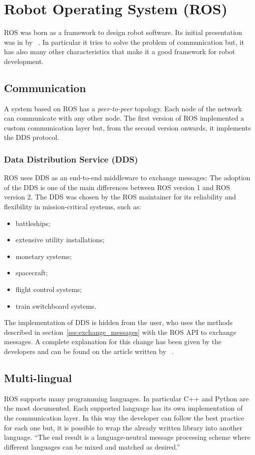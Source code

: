 \documentclass[../thesis.tex]{subfiles}
\begin{document}
\section{Robot Operating System (ROS)}
\acrshort{ROS} was born as a framework to design robot software. Its initial presentation was in \citeyear{paper:ros} by \citeauthor{paper:ros}~\cite{paper:ros}. In particular it tries to solve the problem of communication but, it has also many other characteristics that make it a good framework for robot development.
\subsection{Communication}
A system based on \acrshort{ROS} has a \textit{peer-to-peer} topology. Each node of the network can communicate with any other node. The first version of \acrshort{ROS} implemented a custom communication layer but, from the second version onwards, it implements the \gls{DDS} protocol.
\subsubsection{Data Distribution Service (DDS)}
\gls{ROS} uses \gls{DDS} as an end-to-end middleware to exchange messages: The adoption of the \gls{DDS} is one of the main differences between \gls{ROS} version 1 and \gls{ROS} version 2. The \gls{DDS} was chosen by the \gls{ROS} maintainer for its reliability and flexibility in mission-critical systems, such as:
\begin{itemize}
    \item battleships;
    \item extensive utility installations;
    \item monetary systems;
    \item spacecraft;
    \item flight control systems;
    \item train switchboard systems.
\end{itemize}
The implementation of \gls{DDS} is hidden from the user, who uses the methods described in section~\ref{sss:exchange_messages} with the \gls{ROS} API to exchange messages. A complete explanation for this change has been given by the developers and can be found on the article written by \citeauthor{site:ros_dds}~\cite{site:ros_dds}.

\subsection{Multi-lingual}
\gls{ROS} supports many programming languages. In particular C++ and Python are the most documented. Each supported language has its own implementation of the communication layer. In this way the developer can follow the best practice for each one but, it is possible to wrap the already written library into another language. ``The end result is a language-neutral message processing scheme where different languages can be mixed and matched as desired.''~\cite{paper:ros}
\end{document}
